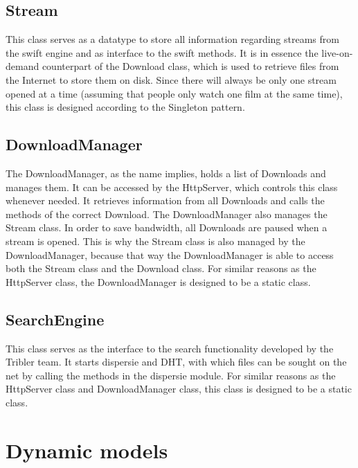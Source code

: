 \subsection{Stream}
This class serves as a datatype to store all information regarding streams from the swift engine and as interface to the swift methods. It is in
essence the live-on-demand counterpart of the Download class, which is used to retrieve files from the Internet to store them on disk.
Since there will always be only one stream opened at a time (assuming that people only watch one film at the same time),
this class is designed according to the Singleton pattern.

\subsection{DownloadManager}
The DownloadManager, as the name implies, holds a list of Downloads and manages them. It can be accessed by the HttpServer, which controls this class whenever needed.
It retrieves information from all Downloads and calls the methods of the correct Download. The DownloadManager also manages the Stream class.
In order to save bandwidth, all Downloads are paused when a stream is opened. This is why the Stream class is also managed by the DownloadManager,
 because that way the DownloadManager is able to access both the Stream class and the Download class. For similar reasons as the HttpServer class, 
 the DownloadManager is designed to be a static class.

\subsection{SearchEngine}
This class serves as the interface to the search functionality developed by the Tribler team. It starts dispersie and DHT,
with which files can be sought on the net by calling the methods in the dispersie module. For similar reasons as the HttpServer class and DownloadManager class, 
this class is designed to be a static class.

\section{Dynamic models}

